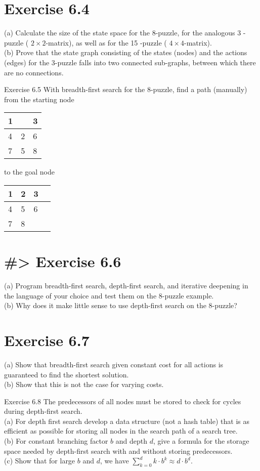 \documentclass[10pt]{article}
\begin{document}
\section*{Exercise 6.4}
(a) Calculate the size of the state space for the 8-puzzle, for the analogous 3 -puzzle ( $2 \times 2$-matrix), as well as for the 15 -puzzle ( $4 \times 4$-matrix).\\
(b) Prove that the state graph consisting of the states (nodes) and the actions (edges) for the 3-puzzle falls into two connected sub-graphs, between which there are no connections.

Exercise 6.5 With breadth-first search for the 8-puzzle, find a path (manually) from the starting node

\begin{center}
\begin{tabular}{|l|l|l|}
\hline
1 &  & 3 \\
\hline
4 & 2 & 6 \\
\hline
7 & 5 & 8 \\
\hline
\end{tabular}
\end{center} to the goal node \begin{tabular}{|l|l|l|l|}
\hline
1 & 2 & 3 \\
\hline
4 & 5 & 6 \\
\hline
7 & 8 &  \\
\hline
\end{tabular}

\section*{\#> Exercise 6.6}
(a) Program breadth-first search, depth-first search, and iterative deepening in the language of your choice and test them on the 8-puzzle example.\\
(b) Why does it make little sense to use depth-first search on the 8-puzzle?

\section*{Exercise 6.7}
(a) Show that breadth-first search given constant cost for all actions is guaranteed to find the shortest solution.\\
(b) Show that this is not the case for varying costs.

Exercise 6.8 The predecessors of all nodes must be stored to check for cycles during depth-first search.\\
(a) For depth first search develop a data structure (not a hash table) that is as efficient as possible for storing all nodes in the search path of a search tree.\\
(b) For constant branching factor $b$ and depth $d$, give a formula for the storage space needed by depth-first search with and without storing predecessors.\\
(c) Show that for large $b$ and $d$, we have $\sum_{k=0}^{d} k \cdot b^{k} \approx d \cdot b^{d}$.
\end{document}
